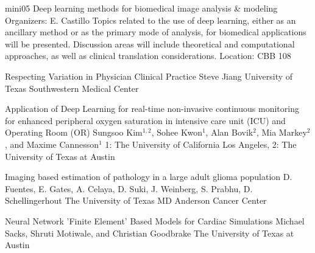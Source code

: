 \mini
{mini05}
{Deep learning methods for biomedical image analysis \& modeling}
{Organizers: E. Castillo}
{Topics related to the use of deep learning, either as an ancillary method or as the primary mode of analysis, for biomedical applications will be presented. Discussion areas will include theoretical and computational approaches, as well as clinical translation considerations.}
{Location: CBB 108}

\begin{talks}
\item\talk
{Respecting Variation in Physician Clinical Practice }
{Steve Jiang}
{University of Texas Southwestern Medical Center}
\item\talk
{Application of Deep Learning for real-time non-invasive continuous monitoring for enhanced peripheral oxygen saturation in intensive care unit (ICU) and Operating Room (OR)}
{Sungsoo Kim$^{1,2}$, Sohee Kwon$^{1}$, Alan Bovik$^{2}$, Mia Markey$^{2}$, and Maxime Cannesson$^{1}$}
{1: The University of California Los Angeles, 2: The University of Texas at Austin}
\item\talk
{Imaging based estimation of pathology in a large adult glioma population}
{D. Fuentes, E. Gates, A. Celaya, D. Suki, J. Weinberg, S. Prabhu, D. Schellingerhout}
{The University of Texas MD Anderson Cancer Center}
\item\talk
{Neural Network ’Finite Element’ Based Models for Cardiac Simulations}
{Michael Sacks, Shruti Motiwale, and Christian Goodbrake}
{The University of Texas at Austin}
\end{talks}
\room
